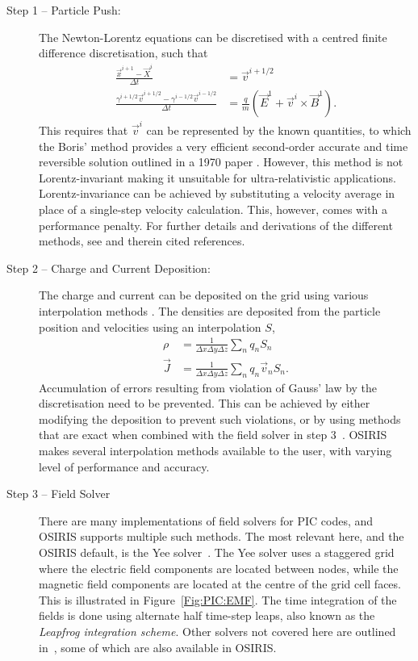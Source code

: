 \begin{description}
    \item[Step 1 -- Particle Push:] The Newton-Lorentz equations can be discretised with a centred finite difference discretisation, such that
    \begin{align}
        \frac{\vec{x}^{i+1} - \vec{X}^i}{\Delta t} &= \vec{v}^{i+1/2} \\
        \frac{\gamma^{i+1/2}\vec{v}^{i+1/2} - \gamma^{i-1/2}\vec{v}^{i-1/2}}{\Delta t} &=
            \frac{q}{m}\left(\vec{E}^1 + \vec{v}^i \times \vec{B}^1\right).
    \end{align}
    This requires that $\vec{v}^i$ can be represented by the known quantities, to which the Boris' method provides a very efficient second-order accurate and time reversible solution outlined in a 1970 paper \cite{boris:1970}.
    However, this method is not Lorentz-invariant \cite{vay:2008} making it unsuitable for ultra-relativistic applications.
    Lorentz-invariance can be achieved by substituting a velocity average in place of a single-step velocity calculation.
    This, however, comes with a performance penalty.
    For further details and derivations of the different methods, see \cite{vay:2016} and therein cited references.
    
    \item[Step 2 -- Charge and Current Deposition:] The charge and current can be deposited on the grid using various interpolation methods \cite{abe:1986}.
    The densities are deposited from the particle position and velocities using an interpolation $S$,
    \begin{align}
        \rho    &= \frac{1}{\Delta x \Delta y \Delta z} \sum_n q_n S_n \\
        \vec{J} &= \frac{1}{\Delta x \Delta y \Delta z} \sum_n q_n \vec{v}_n S_n.
    \end{align}
    Accumulation of errors resulting from violation of Gauss' law by the discretisation need to be prevented.
    This can be achieved by either modifying the deposition to prevent such violations, or by using methods that are exact when combined with the field solver in step 3~\cite{vay:2016}.
    OSIRIS makes several interpolation methods available to the user, with varying level of performance and accuracy.
    
    \item[Step 3 -- Field Solver] There are many implementations of field solvers for PIC codes, and OSIRIS supports multiple such methods.
    The most relevant here, and the OSIRIS default, is the Yee solver~\cite{yee:1966}.
    The Yee solver uses a staggered grid where the electric field components are located between nodes, while the magnetic field components are located at the centre of the grid cell faces.
    This is illustrated in Figure~\ref{Fig:PIC:EMF}.
    The time integration of the fields is done using alternate half time-step leaps, also known as the \textit{Leapfrog integration scheme}.
    Other solvers not covered here are outlined in~\cite{vay:2016}, some of which are also available in OSIRIS.
    

\end{description}
